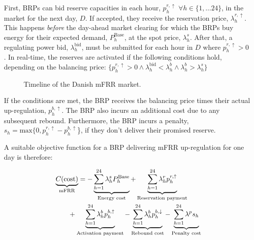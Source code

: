 First, BRPs can bid reserve capacities in each hour, $p_{h}^{r,\uparrow}$ $\forall{h} \in \{1, \ldots 24 \}$, in the market for the next day, $D$. If accepted, they receive the reservation price, $\lambda_{h}^{r,\uparrow}$. This happens \textit{before} the day-ahead market clearing for which the BRPs buy energy for their expected demand, $P_{h}^{\text{Base}}$, at the spot price, $\lambda_{h}^{s}$. After that, a regulating power bid, $\lambda_{h}^{\text{bid}}$, must be submitted for each hour in $D$ where $p_{h}^{r,\uparrow} > 0$ \cite{energinet:Systemydelser}. In real-time, the reserves are activated if the following conditions hold, depending on the balancing price: $\{p_{h}^{r,\uparrow} > 0 \land \lambda_{h}^{\text{bid}} <  \lambda_{h}^{b} \land \lambda_{h}^{b} > \lambda_{h}^{s} \}$



\begin{figure}[!t]
    \centering
    
    \caption{Timeline of the Danish mFRR market.}
    \label{fig:timeline_mfrr}
\end{figure}


If the conditions are met, the BRP receives the balancing price times their actual up-regulation, $p_{h}^{b,\uparrow}$. The BRP also incurs an additional cost due to any subsequent rebound. Furthermore, the BRP incurs a penalty, $s_{h} = \text{max}\{0, p_{h}^{r,\uparrow} - p_{h}^{b,\uparrow}$\}, if they don't deliver their promised reserve.

A suitable objective function for a BRP delivering mFRR up-regulation for one day is therefore:

\begin{align}\label{eq:mFRRObjective}
     & \underbrace{C(\text{cost})}_{\text{mFRR}} = - \underbrace{\sum_{h=1}^{24} \lambda^{s}_{h}P^{\text{Base}}_{h}}_{\textrm{Energy cost}} + \underbrace{\sum_{h=1}^{24}\lambda_{h}^{r} p^{r, \uparrow}_{h}}_{\textrm{Reservation payment}}  \notag \\ & \quad \quad + \underbrace{\sum_{h=1}^{24}  \lambda_{h}^{b} p^{b,\uparrow}_{h}}_{\textrm{Activation payment}} - \underbrace{\sum_{h=1}^{24}  \lambda_{h}^{b} p^{b,\downarrow}_{h}}_{\textrm{Rebound cost}} - \underbrace{ \sum_{h=1}^{24}  \lambda^{p}s_{h}}_{\textrm{Penalty cost}}
\end{align}


